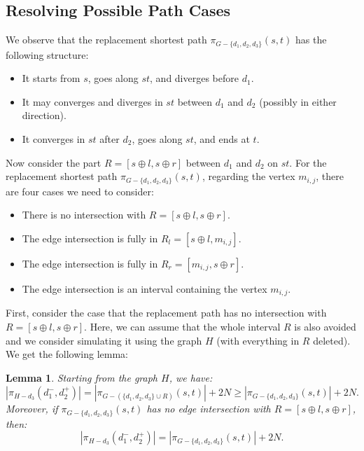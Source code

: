 \documentclass[11pt]{article}
\theoremstyle{plain}
\newtheorem{lemma}[theorem]{Lemma}
\theoremstyle{definition}
\newcommand{\set}[1]{\{ #1 \}}
\newcommand{\og}[3]{\pi_{G-#3}\left(#1,#2\right)}
\newcommand{\hg}[3]{\pi_{H-#3}\left(#1,#2\right)}
\begin{document}
\subsection{Resolving Possible Path Cases}\label{section:2edge}

We observe that the replacement shortest path $\og{s}{t}{\set{d_1, d_2, d_3}}$ has the following structure:

\begin{itemize}
    \item It starts from $s$, goes along $st$, and diverges before $d_1$. 
    \item It may converges and diverges in $st$ between $d_1$ and $d_2$ (possibly in either direction). 
    \item It converges in $st$ after $d_2$, goes along $st$, and ends at $t$.
\end{itemize}

Now consider the part $R=[s \oplus l, s \oplus r]$ between $d_1$ and $d_2$ on $st$. For the replacement shortest path $\og{s}{t}{\set{d_1, d_2, d_3}}$, regarding the vertex $m_{i,j}$, there are four cases we need to consider:

\begin{itemize}
    \item There is no intersection with $R=[s \oplus l, s \oplus r]$.
    \item The edge intersection is fully in $R_l=[s \oplus l, m_{i,j}]$.
    \item The edge intersection is fully in $R_r=[m_{i,j},s \oplus r]$.
    \item The edge intersection is an interval containing the vertex $m_{i,j}$.
\end{itemize}

First, consider the case that the replacement path has no intersection with $R=[s \oplus l, s \oplus r]$. Here, we can assume that the whole interval $R$ is also avoided and we consider simulating it using the graph $H$ (with everything in $R$ deleted). We get the following lemma:

\begin{lemma}\label{2edgecase1}
    Starting from the graph $H$, we have:
    \[|\hg{d_1^-}{d_2^+}{d_3}| = |\og{s}{t}{(\set{d_1, d_2, d_3} \cup R)}| + 2N \geq |\og{s}{t}{\set{d_1, d_2, d_3}}| + 2N.\]
    Moreover, if $\og{s}{t}{\set{d_1, d_2, d_3}}$ has no edge intersection with $R=[s \oplus l, s \oplus r]$, then:
    \[|\hg{d_1^-}{d_2^+}{d_3}| = |\og{s}{t}{\set{d_1, d_2, d_3}}| + 2N.\]
\end{lemma}
\end{document}

